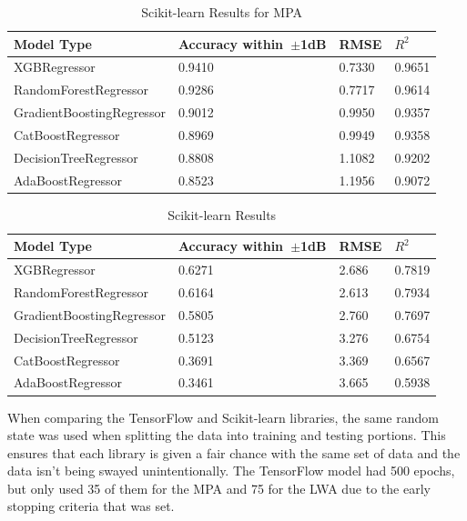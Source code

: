 \documentclass[conference]{IEEEtran}
\begin{document}
\begin{table}[h]
\caption{Scikit-learn Results for MPA}
\begin{center}
\begin{tabular}{ |l|l|l|l| }
    \hline
    Model Type & Accuracy within~$\pm$1dB & RMSE & $R^2$ \\ 
    \hline
    XGBRegressor & 0.9410 & 0.7330 & 0.9651 \\  
    \hline
    RandomForestRegressor & 0.9286 & 0.7717 & 0.9614 \\
    \hline  
    GradientBoostingRegressor & 0.9012 & 0.9950 & 0.9357 \\
    \hline
    CatBoostRegressor & 0.8969 & 0.9949 & 0.9358 \\    
    \hline
    DecisionTreeRegressor & 0.8808 & 1.1082 & 0.9202 \\  
    \hline
    AdaBoostRegressor & 0.8523 & 1.1956 & 0.9072 \\  
    \hline
\end{tabular}
\end{center}
\label{comparing_sklearn_p}
\end{table}

\begin{table}[h]
\caption{Scikit-learn Results}
\begin{center}
\begin{tabular}{ |l|l|l|l| }
    \hline
    Model Type & Accuracy within~$\pm$1dB & RMSE & $R^2$ \\ 
    \hline
    XGBRegressor & 0.6271 & 2.686 & 0.7819 \\  
    \hline
    RandomForestRegressor & 0.6164 & 2.613 & 0.7934 \\
    \hline  
    GradientBoostingRegressor & 0.5805 & 2.760 & 0.7697 \\
    \hline
    DecisionTreeRegressor & 0.5123 & 3.276 & 0.6754 \\  
    \hline
    CatBoostRegressor & 0.3691 & 3.369 & 0.6567 \\    
    \hline
    AdaBoostRegressor & 0.3461 & 3.665 & 0.5938 \\  
    \hline
\end{tabular}
\end{center}
\label{comparing_sklearn_lw}
\end{table}

When comparing the TensorFlow and Scikit-learn libraries, the same random state was used when splitting the data into training and testing portions. This ensures that each library is given a fair chance with the same set of data and the data isn't being swayed unintentionally. The TensorFlow model had 500 epochs, but only used 35 of them for the MPA and 75 for the LWA due to the early stopping criteria that was set. 
\end{document}
